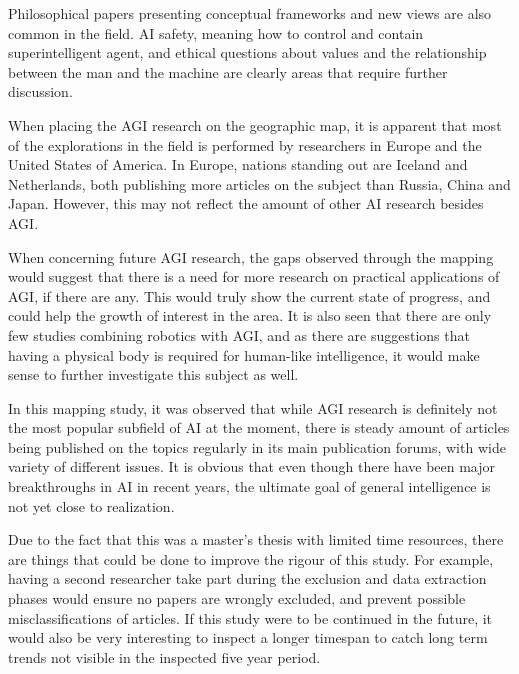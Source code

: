 Philosophical papers presenting conceptual frameworks and new views are also
common in the field. AI safety, meaning how to control and contain
superintelligent agent, and ethical questions about values and the relationship
between the man and the machine are clearly areas that require further
discussion.

When placing the AGI research on the geographic map, it is apparent that most of
the explorations in the field is performed by researchers in Europe and the
United States of America. In Europe, nations standing out are Iceland and
Netherlands, both publishing more articles on the subject than Russia, China and
Japan. However, this may not reflect the amount of other AI research besides
AGI.

When concerning future AGI research, the gaps observed through the
mapping would suggest that there is a need for more research on practical
applications of AGI, if there are any. This would truly show the current state
of progress, and could help the growth of interest in the area. It is also seen
that there are only few studies combining robotics with AGI, and as there are
suggestions that having a physical body is required for human-like intelligence,
it would make sense to further investigate this subject as well.

In this mapping study, it was observed that while AGI research is definitely not
the most popular subfield of AI at the moment, there is steady amount of
articles being published on the topics regularly in its main publication forums,
with wide variety of different issues. It is obvious that even though
there have been major breakthroughs in AI in recent years, the ultimate goal of
general intelligence is not yet close to realization.

Due to the fact that this was a master's thesis with limited time resources,
there are things that could be done to improve the rigour of this study. For
example, having a second researcher take part during the exclusion and data
extraction phases would ensure no papers are wrongly excluded, and prevent
possible misclassifications of articles. If this study were to be continued in
the future, it would also be very interesting to inspect a longer timespan to
catch long term trends not visible in the inspected five year period.


\printbibliography

\appendix


